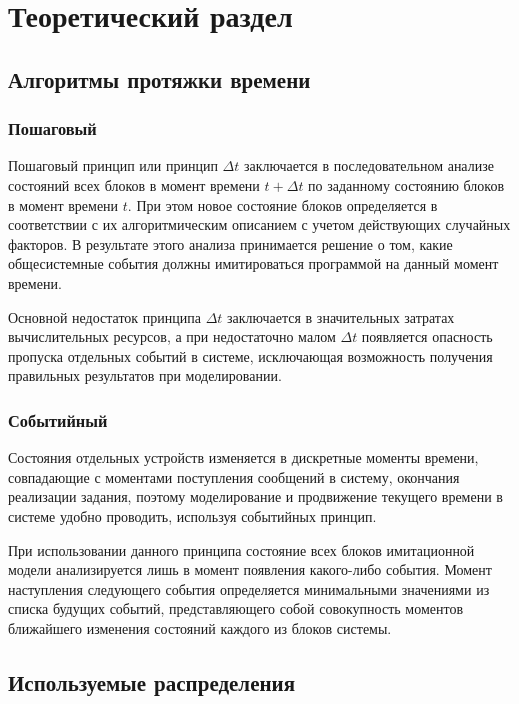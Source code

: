 \chapter{Теоретический раздел}

\section{Алгоритмы протяжки времени}

\subsection{Пошаговый}

Пошаговый принцип или принцип $\Delta t$ заключается в последовательном анализе состояний всех блоков в момент времени $t + \Delta t$ по заданному состоянию блоков в момент времени $t$.
При этом новое состояние блоков определяется в соответствии с их алгоритмическим описанием с учетом действующих случайных факторов. 
В результате этого анализа принимается решение о том, какие общесистемные события должны имитироваться программой на данный момент времени.

Основной недостаток принципа $\Delta t$ заключается в значительных затратах вычислительных ресурсов, а при недостаточно малом $\Delta t$ появляется опасность пропуска отдельных событий в системе, исключающая возможность получения правильных результатов при моделировании.

\subsection{Событийный}

Состояния отдельных устройств изменяется в дискретные моменты времени, совпадающие с моментами поступления сообщений в систему, окончания реализации задания, поэтому моделирование и продвижение текущего времени в системе удобно проводить, используя событийных принцип.

При использовании данного принципа состояние всех блоков имитационной модели анализируется лишь в момент появления какого-либо события.
Момент наступления следующего события определяется минимальными значениями из списка будущих событий, представляющего собой совокупность моментов ближайшего изменения состояний каждого из блоков системы.

\section{Используемые распределения}

